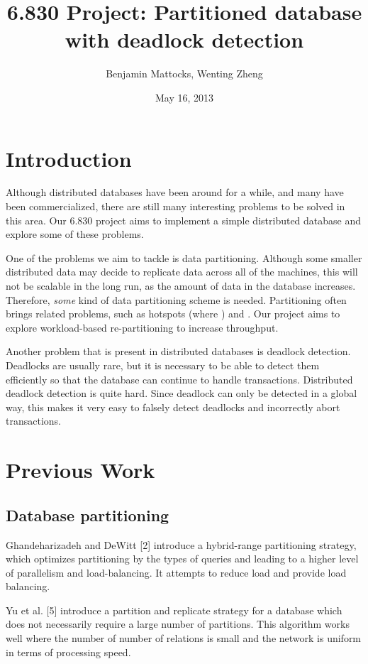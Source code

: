 \documentclass[a4paper, 10pt, notitlepage]{article}
\title{6.830 Project: Partitioned database with deadlock detection}
\author{Benjamin Mattocks, Wenting Zheng}
\date{May 16, 2013} %
\begin{document}
\maketitle
\thispagestyle{empty}
\newpage


\section{Introduction}

Although distributed databases have been around for a while, and many have been commercialized, there are still many
interesting problems to be solved in this area. Our 6.830 project aims to implement a simple distributed database
and explore some of these problems.

One of the problems we aim to tackle is data partitioning. Although some smaller distributed data may decide to replicate
data across all of the machines, this will not be scalable in the long run, as the amount of data in the database
increases. Therefore, {\em some} kind of data partitioning scheme is needed. Partitioning often brings related problems, such
as hotspots (where ) and . Our project aims to explore workload-based re-partitioning to increase throughput.

Another problem that is present in distributed databases is deadlock detection. Deadlocks are usually rare, but it is necessary
to be able to detect them efficiently so that the database can continue to handle transactions. Distributed deadlock detection
is quite hard. Since deadlock can only be detected in a global way, this makes it very easy to falsely detect deadlocks and
incorrectly abort transactions.


\section{Previous Work}

\subsection{Database partitioning}
Ghandeharizadeh and DeWitt [2] introduce a hybrid-range partitioning strategy, which optimizes partitioning by the types of queries and leading to a higher level of parallelism and load-balancing. It attempts to reduce load and provide load balancing.

Yu et al. [5] introduce a partition and replicate strategy for a database which does not necessarily require a large number of partitions. This algorithm works well where the number of number of relations is small and the network is uniform in terms of processing speed.
\end{document}
